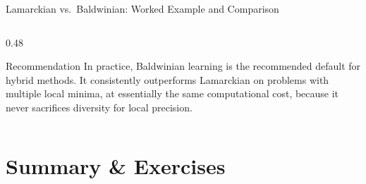 \documentclass[aspectratio=169,10pt]{beamer}
\begin{document}
\begin{frame}[allowframebreaks]{Lamarckian vs.\ Baldwinian: Worked Example and Comparison}
\begin{columns}[T]
\begin{column}{0.48\textwidth}
      \begin{alertblock}{Recommendation}
        In practice, Baldwinian learning is the recommended default
        for hybrid methods.  It consistently outperforms Lamarckian
        on problems with multiple local minima, at essentially the
        same computational cost, because it never sacrifices
        diversity for local precision.
      \end{alertblock}
    \end{column}
  \end{columns}

\end{frame}

\section{Summary \& Exercises}
\end{document}
